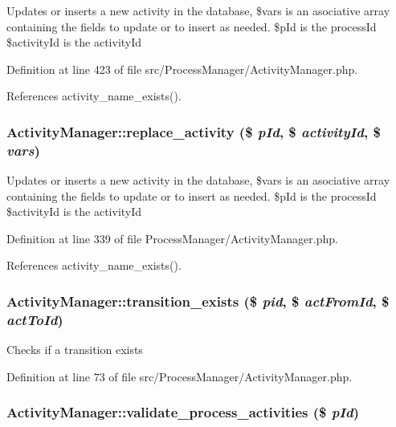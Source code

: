 Updates or inserts a new activity in the database, \$vars is an asociative array containing the fields to update or to insert as needed. \$p\-Id is the process\-Id \$activity\-Id is the activity\-Id 

Definition at line 423 of file src/Process\-Manager/Activity\-Manager.php.

References activity\_\-name\_\-exists().
\subsubsection{\setlength{\rightskip}{0pt plus 5cm}Activity\-Manager::replace\_\-activity (\$ {\em p\-Id}, \$ {\em activity\-Id}, \$ {\em vars})}\label{classActivityManager_a15}


Updates or inserts a new activity in the database, \$vars is an asociative array containing the fields to update or to insert as needed. \$p\-Id is the process\-Id \$activity\-Id is the activity\-Id 

Definition at line 339 of file Process\-Manager/Activity\-Manager.php.

References activity\_\-name\_\-exists().
\subsubsection{\setlength{\rightskip}{0pt plus 5cm}Activity\-Manager::transition\_\-exists (\$ {\em pid}, \$ {\em act\-From\-Id}, \$ {\em act\-To\-Id})}\label{classActivityManager_a21}


Checks if a transition exists 

Definition at line 73 of file src/Process\-Manager/Activity\-Manager.php.
\subsubsection{\setlength{\rightskip}{0pt plus 5cm}Activity\-Manager::validate\_\-process\_\-activities (\$ {\em p\-Id})}\label{classActivityManager_a29}


